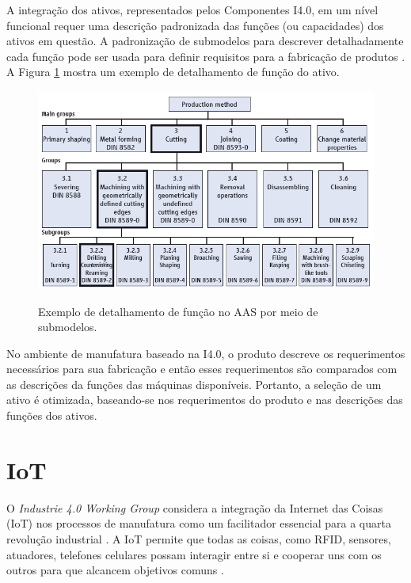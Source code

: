 \documentclass[
	12pt,				%
	oneside,			%
	a4paper,			%
	english,			%
	brazil				%
]{abntex2}
\begin{document}
	A integração dos ativos, representados pelos Componentes I4.0, em um nível funcional requer uma descrição padronizada das funções (ou capacidades) dos ativos em questão. A padronização de submodelos para descrever detalhadamente cada função pode ser usada para definir requisitos para a fabricação de produtos \cite{bedenbender2017aasexamples}. A Figura \ref{fig:submodelos} mostra um exemplo de detalhamento de função do ativo.
	
	\begin{figure}[H]
		\centering
		\caption{Exemplo de detalhamento de função no AAS por meio de submodelos.}
		\includegraphics[width=1\textwidth]{submodelos.png}
		\label{fig:submodelos}
	\end{figure}

	No ambiente de manufatura baseado na I4.0, o produto descreve os requerimentos necessários para sua fabricação e então esses requerimentos são comparados com as descrições da funções das máquinas disponíveis. Portanto, a seleção de um ativo é otimizada, baseando-se nos requerimentos do produto e nas descrições das funções dos ativos.
	
	\section{IoT}
	
	O \textit{Industrie 4.0 Working Group} considera a integração da Internet das Coisas (IoT) nos processos de manufatura como um facilitador essencial para a quarta revolução industrial \cite{kagermann2013recommendations}. A IoT permite que todas as coisas, como RFID, sensores, atuadores, telefones celulares possam interagir entre si e cooperar uns com os outros para que alcancem objetivos comuns \cite{giusto2010internet}.
\end{document}
